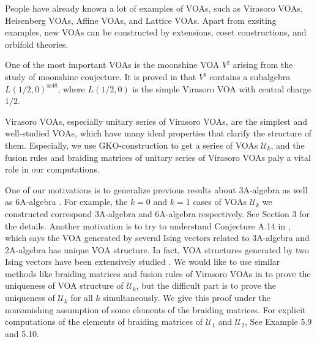 \documentclass{article}
\begin{document}
	People have already known a lot of examples of VOAs,
	such as Virasoro VOAs, Heisenberg VOAs, Affine VOAs,
	and Lattice VOAs. Apart from exsiting examples,
	new VOAs can be constructed by extensions, coset constructions,
	and orbifold theories.
	
	One of the most important VOAs 
	is the moonshine VOA $V^{\natural}$
	arising from the study of moonshine conjecture.
	It is proved in \cite{DMZ} that $V^{\natural}$ contains a 
	subalgebra $L(1/2,0)^{\otimes 48}$,
	where $L(1/2,0)$ is the simple Virasoro VOA with central charge $1/2$.
	
	Virasoro VOAs, especially unitary series of Virasoro VOAs, are the simplest and well-studied VOAs, which
	have many ideal properties that clarify the structure of them.
	Especially, we use GKO-construction 
	to get a series of VOAs $\mathcal{U}_k$, 
	and the fusion rules and braiding matrices \cite{FFK,H1,H2} of unitary series of Virasoro VOAs
	paly a vital role in our computations.
	
	One of our motivations is to generalize previous results about 3A-algebra \cite{M,SY} as well as 6A-algebra \cite{DJY,JZ}. For example, the $k=0$ and $k=1$ cases of VOAs $\mathcal{U}_k$ we constructed correspond  3A-algebra and 6A-algebra respectively. See Section 3 for the details. Another motivation is to try to understand Conjecture A.14 in \cite{LY}, which says the VOA generated by several Ising vectors related to 3A-algebra and 2A-algebra has unique VOA structure.
	In fact, VOA structures generated by two Ising vectors have been extensively studied \cite{M,SY,LYY, DJY, DZ, JZ, Zheng}. We would like to use similar methods like braiding matrices and fusion rules of Virasoro VOAs in \cite{DJY,DZ} to prove the uniqueness of VOA structure of $\mathcal{U}_k$, but the difficult part is to prove the uniqueness of $\mathcal{U}_k$ for all $k$ simultaneously.
	We give this proof under the nonvanishing assumption of some elements of the braiding matrices. For explicit computations of the elements of braiding matrices of $\mathcal{U}_1$ and $\mathcal{U}_2$, See Example 5.9 and 5.10.
	 
	
\end{document}
